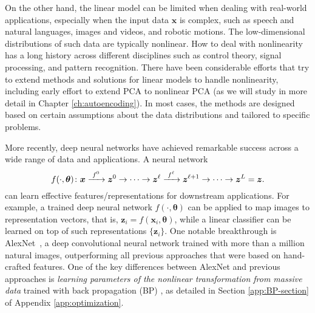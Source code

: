 \documentclass[\toplevelprefix/book-main.tex]{subfiles}
\begin{document}
On the other hand, the linear model can be limited when dealing with real-world applications, especially when the input data $\bm{x}$ is complex, such as speech and natural languages, images and videos, and robotic motions. The low-dimensional distributions of such data are typically nonlinear. 
How to deal with nonlinearity has a long history across different disciplines such as control theory, signal processing, and pattern recognition.  There have been considerable efforts that try to extend methods and solutions for linear models to handle nonlinearity, including early effort to extend PCA to nonlinear PCA (as we will study in more detail in Chapter \ref{ch:autoencoding}).  In most cases, the methods are designed based on certain assumptions about the data distributions and tailored to specific problems. 

More recently, deep neural networks have achieved remarkable success across a wide range of data and applications. A neural network
\begin{equation}
  f(\cdot, \bm \theta) \colon \bm{x}
  \xrightarrow{\hspace{1mm} f^0 \hspace{1mm}} \bm{z}^0 \rightarrow \cdots
  \rightarrow \bm{z}^\ell \xrightarrow{\hspace{1mm} f^\ell \hspace{1mm}}
  \bm{z}^{\ell+1} \rightarrow  \cdots \to \bm{z}^L = \bm{z}.
\end{equation}
can learn effective features/representations for downstream applications. For example, a trained deep neural network $f(\cdot, \bm \theta)$ can be applied to map images to representation vectors, that is, $\bm{z}_i = f(\bm{x}_i,\bm \theta)$, while a linear classifier can be learned on top of such representations $\{\bm{z}_i\}$. One notable breakthrough is AlexNet~\cite{krizhevsky2012imagenet}, a deep convolutional neural network trained with more than a million natural images, outperforming all previous approaches that were based on hand-crafted features. One of the key differences between AlexNet and previous approaches is \textit{learning parameters of the nonlinear transformation from massive data} trained with back propagation (BP) \cite{Back-Prop}, as detailed in Section \ref{app:BP-section} of Appendix \ref{app:optimization}. 


\end{document}
